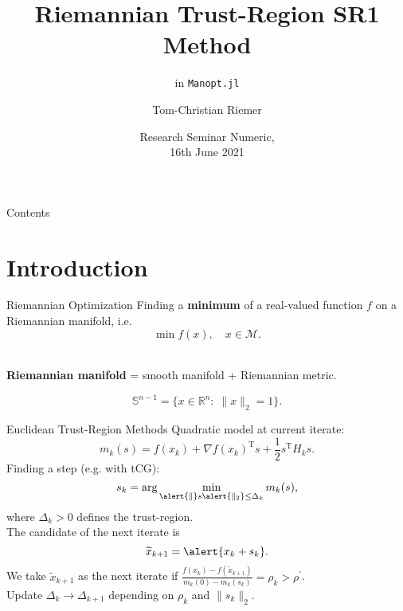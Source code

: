 \documentclass{beamer}
\title{Riemannian Trust-Region SR1 Method}
\subtitle{in \lstinline!Manopt.jl!}
\author{Tom-Christian Riemer}
\institute{TU Chemnitz}
\date{Research Seminar Numeric,\\ 16th June 2021}
\begin{document}
\maketitle

\begin{frame}{Contents}
	\tableofcontents
\end{frame}

\section{Introduction}

\begin{frame}{Riemannian Optimization}
    Finding a \textbf{minimum} of a real-valued function $f$ on a Riemannian manifold, i.e. \\
    \begin{equation*}
        \min f(x), \quad x \in \mathcal{M}.
    \end{equation*}\\[1.\baselineskip]
    \begin{center}
        \textbf{Riemannian manifold} = smooth manifold + Riemannian metric. \\[1.\baselineskip]
    \end{center}
    \begin{equation*}
        \mathbb{S}^{n-1} = \{ x \in \mathbb{R}^n \colon \; \lVert x \rVert_2 = 1 \}.
    \end{equation*}
\end{frame}

\begin{frame}{Euclidean Trust-Region Methods}
    \alert{Quadratic model} at current iterate:
	\begin{equation*}
    	m_k(s) = f(x_k) + {\nabla f(x_k)}^{\mathrm{T}} s + \frac{1}{2} s^{\mathrm{T}} H_k s.
    \end{equation*}
	Finding a \alert{step} (e.g. with tCG):
	\begin{equation*}
        s_k = \arg \min_{\alert{\lVert} s \alert{\rVert_2} \leq \Delta_k} m_k(s),
    \end{equation*}
	where $\Delta_k > 0$ defines the \alert{trust-region}. \\
    The candidate of the next iterate is
	\begin{equation*}
        \widetilde{x}_{k+1} = \alert{x_k + s_k}.
    \end{equation*}
	We take $\widetilde{x}_{k+1}$ as the next iterate if $\frac{f(x_k) - f(\widetilde{x}_{k+1})}{m_k(0) - m_k(s_k)} =\rho_k > \rho^{\prime}$. \\[0.1\baselineskip]
    Update $\Delta_k \rightarrow \Delta_{k+1}$ depending on $\rho_k$ and $\lVert s_k \rVert_2$.
\end{frame}
\end{document}
